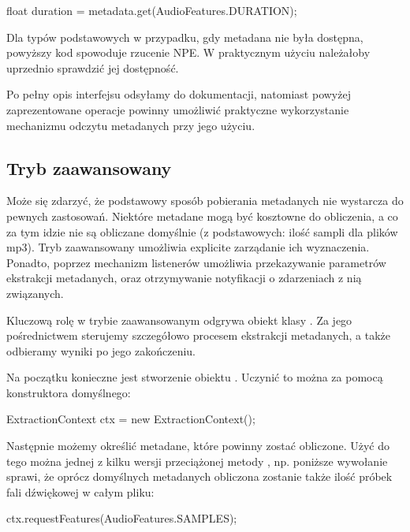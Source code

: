 \begin{java}
float duration = metadata.get(AudioFeatures.DURATION);
\end{java}

\begin{Warning}
Dla typów podstawowych w przypadku, gdy metadana  nie była dostępna, powyższy kod
spowoduje rzucenie NPE. W praktycznym użyciu należałoby uprzednio sprawdzić jej dostępność.
\end{Warning}

Po pełny opis interfejsu  odsyłamy do dokumentacji, natomiast powyżej
zaprezentowane operacje powinny umożliwić praktyczne wykorzystanie mechanizmu odczytu metadanych
przy jego użyciu.

\subsection{Tryb zaawansowany}

Może się zdarzyć, że podstawowy sposób pobierania metadanych nie wystarcza do pewnych zastosowań.
Niektóre metadane mogą być kosztowne do obliczenia, a co za tym idzie nie są obliczane domyślnie (z
podstawowych: ilość sampli dla plików mp3). Tryb zaawansowany umożliwia explicite zarządanie ich
wyznaczenia. Ponadto, poprzez mechanizm listenerów umożliwia przekazywanie parametrów ekstrakcji
metadanych, oraz otrzymywanie notyfikacji o zdarzeniach z nią związanych.

Kluczową rolę w trybie zaawansowanym odgrywa obiekt klasy . Za jego
pośrednictwem sterujemy szczegółowo procesem ekstrakcji metadanych, a także odbieramy wyniki po jego
zakończeniu.

Na początku konieczne jest stworzenie obiektu . Uczynić to można za pomocą
konstruktora domyślnego:

\begin{java}
ExtractionContext ctx = new ExtractionContext();
\end{java}

Następnie możemy określić metadane, które powinny zostać obliczone. Użyć do tego można jednej z
kilku wersji przeciążonej metody , np. poniższe wywołanie sprawi, że oprócz
domyślnych metadanych obliczona zostanie także ilość próbek fali dźwiękowej w całym pliku:

\begin{java}
ctx.requestFeatures(AudioFeatures.SAMPLES);
\end{java}

